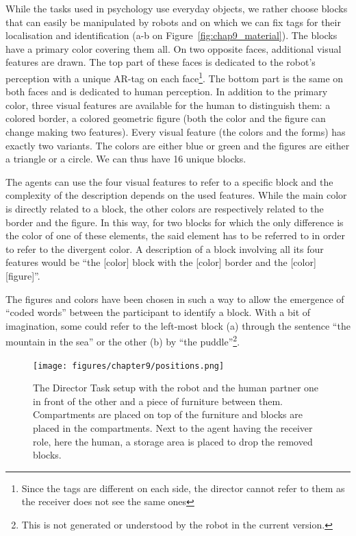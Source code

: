 While the tasks used in psychology use everyday objects, we rather choose blocks that can easily be manipulated by robots and on which we can fix tags for their localisation and identification (a-b on Figure~\ref{fig:chap9_material}). The blocks have a primary color covering them all. On two opposite faces, additional visual features are drawn. The top part of these faces is dedicated to the robot's perception with a unique AR-tag on each face\footnote{Since the tags are different on each side, the director cannot refer to them as the receiver does not see the same ones}. The bottom part is the same on both faces and is dedicated to human perception. In addition to the primary color, three visual features are available for the human to distinguish them: a colored border, a colored geometric figure (both the color and the figure can change making two features). Every visual feature (the colors and the forms) has exactly two variants. The colors are either blue or green and the figures are either a triangle or a circle. We can thus have 16 unique blocks.

The agents can use the four visual features to refer to a specific block and the complexity of the description depends on the used features. While the main color is directly related to a block, the other colors are respectively related to the border and the figure. In this way, for two blocks for which the only difference is the color of one of these elements, the said element has to be referred to in order to refer to the divergent color. A description of a block involving all its four features would be ``the [color] block with the [color] border and the [color] [figure]''.

The figures and colors have been chosen in such a way to allow the emergence of ``coded words'' between the participant to identify a block. With a bit of imagination, some could refer to the left-most block (a) through the sentence ``the mountain in the sea'' or the other (b) by ``the puddle''\footnote{This is not generated or understood by the robot in the current version.}.

\begin{figure}[ht!]
\centering
\texttt{[image: figures/chapter9/positions.png]}
\caption{\label{fig:chap9_positions} The Director Task setup with the robot and the human partner one in front of the other and a piece of furniture between them. Compartments are placed on top of the furniture and blocks are placed in the compartments. Next to the agent having the receiver role, here the human, a storage area is placed to drop the removed blocks. }
\end{figure}


